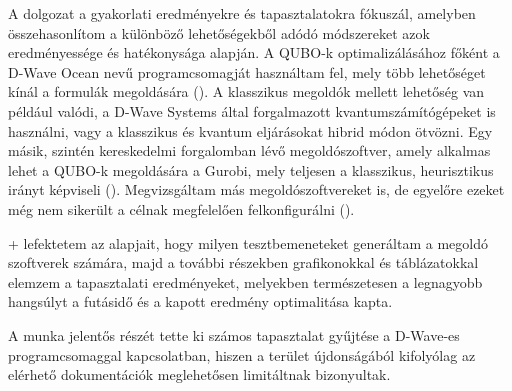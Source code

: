 A dolgozat  a gyakorlati eredményekre és tapasztalatokra fókuszál, amelyben összehasonlítom a különböző lehetőségekből adódó módszereket azok eredményessége és hatékonysága alapján.
A QUBO-k optimalizálásához főként a D-Wave Ocean nevű programcsomagját használtam fel, mely több lehetőséget kínál a formulák megoldására (). A klasszikus megoldók mellett lehetőség van például valódi, a D-Wave Systems által forgalmazott kvantumszámítógépeket is használni, vagy a klasszikus és kvantum eljárásokat hibrid módon ötvözni.
Egy másik, szintén kereskedelmi forgalomban lévő megoldószoftver, amely alkalmas lehet a QUBO-k megoldására a Gurobi, mely teljesen a klasszikus, heurisztikus irányt képviseli (). Megvizsgáltam más megoldószoftvereket is, de egyelőre ezeket még nem sikerült a célnak megfelelően felkonfigurálni ().

\Az+ lefektetem az alapjait, hogy milyen tesztbemeneteket generáltam a megoldó szoftverek számára, majd a további részekben grafikonokkal és táblázatokkal elemzem a tapasztalati eredményeket, melyekben természetesen a legnagyobb hangsúlyt a futásidő és a kapott eredmény optimalitása kapta.

A munka jelentős részét tette ki számos tapasztalat gyűjtése a D-Wave-es programcsomaggal kapcsolatban, hiszen a terület újdonságából kifolyólag az elérhető dokumentációk meglehetősen limitáltnak bizonyultak.